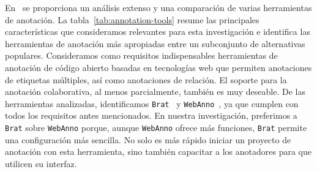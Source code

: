 En~\citet{annotation-tools} se proporciona un análisis extenso y una comparación de varias herramientas de anotación.
La tabla~\ref{tab:annotation-tools} resume las principales características que consideramos relevantes para esta investigación e identifica las herramientas de anotación más apropiadas entre un subconjunto de alternativas populares.
Consideramos como requisitos indispensables herramientas de anotación de código abierto basadas en tecnologías web que permiten anotaciones de etiquetas múltiples, así como anotaciones de relación.
El soporte para la anotación colaborativa, al menos parcialmente, también es muy deseable.
De las herramientas analizadas, identificamos \texttt{Brat}~\cite{brat} y \texttt{WebAnno}~\cite{webanno}, ya que cumplen con todos los requisitos antes mencionados.
En nuestra investigación, preferimos a \texttt{Brat} sobre \texttt{WebAnno} porque, aunque \texttt{WebAnno} ofrece más funciones, \texttt{Brat} permite una configuración más sencilla.
No solo es más rápido iniciar un proyecto de anotación con esta herramienta, sino también capacitar a los anotadores para que utilicen su interfaz.

